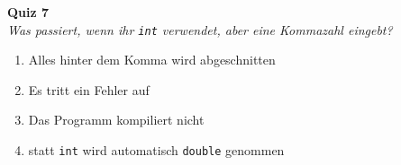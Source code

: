 \textbf{Quiz 7}\\
\textit{Was passiert, wenn ihr \texttt{int} verwendet, aber eine Kommazahl eingebt?}
\begin{enumerate}[label=\alph*)]
	\item Alles hinter dem Komma wird abgeschnitten
	\item Es tritt ein Fehler auf
	\item Das Programm kompiliert nicht
	\item statt \texttt{int} wird automatisch \texttt{double} genommen
\end{enumerate}

